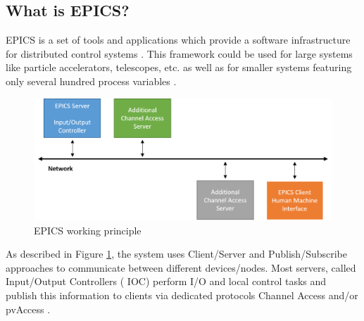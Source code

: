 


\subsection{What is EPICS?} 
\label{EPICS}
EPICS is a set of tools and applications which provide a software infrastructure for distributed control systems \cite{EPICS_license}. This framework could be used for large systems like particle accelerators, telescopes, etc. as well as for smaller systems featuring only several hundred process variables \cite{EPICS_1, EPICS_2, EPICS_3, EPICS_4}.
\begin{figure}[!h]
\centering
\includegraphics[width=0.7\columnwidth]{Chapter3/DCS/images/EPICS.png}
\caption{EPICS working principle}
\label{fig_EPICS}
\end{figure}
As described in Figure \ref{fig_EPICS}, the system uses Client/Server and Publish/Subscribe approaches to communicate between different devices/nodes. Most servers, called Input/Output Controllers ( \gls{IOC}) perform I/O and local control tasks and publish this information to clients via dedicated protocols Channel Access and/or pvAccess \cite{EPICS}. 

